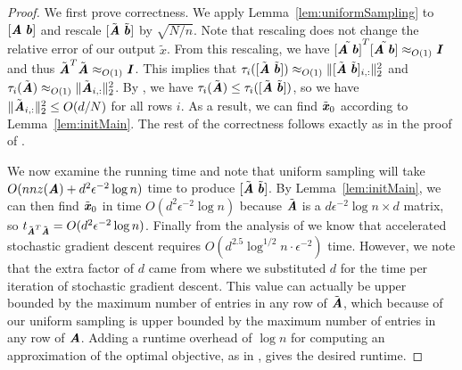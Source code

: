 
\noFastMatrixMult*

\begin{proof}
	We first prove correctness.
	We apply Lemma~\ref{lem:uniformSampling} to $[\AA\;\bb]$ and rescale $[\tilde{\AA}\;\tilde{\bb}]$ by $\sqrt{N/n}$.
	Note that rescaling does not change the relative error of our output $\tilde{x}$.
	From this rescaling, we have $\tilde{[\AA\;\bb]}^T\tilde{[\AA\;\bb]} \approx_{O(1)} \II$ and thus $\tilde{\AA}^T\tilde{\AA} \approx_{O(1)} \II$.
	This implies that $\tau_i([\tilde{\AA}\;\tilde{\bb}]) \approx_{O(1)} \|[\tilde{\AA}\;\tilde{\bb}]_{i,:}\|_2^2$ and $\tau_i(\tilde{\AA}) \approx_{O(1)} \|\tilde{\AA}_{i,:}\|_2^2$.
	By , we have $\tau_i(\tilde{\AA}) \leq \tau_i([\tilde{\AA}\;\tilde{\bb}])$, so we have $\|\tilde{\AA}_{i,:}\|_2^2 \leq O(d/N)$ for all rows $i$.
	As a result, we can find $\tilde{\xx}_0$ according to Lemma~\ref{lem:initMain}.
	The rest of the correctness follows exactly as in the proof of .
	
	We now examine the running time and note that uniform sampling will take $O(nnz(\AA) + d^2\epsilon^{-2}\log{n})$ time to produce $[\tilde{\AA}\;\tilde{\bb}]$.
	By Lemma~\ref{lem:initMain}, we can then find $\tilde{\xx}_0$ in time $O(d^2\epsilon^{-2}\log{n})$ because $\tilde{\AA}$ is a $d\epsilon^{-2}\log{n} \times d$ matrix, so $t_{\tilde{\AA}^T\tilde{\AA}} = O(d^2\epsilon^{-2}\log{n})$.
	Finally from the analysis of  we know that accelerated stochastic gradient descent requires $O(d^{2.5}\log^{1/2}{n}\cdot \epsilon^{-2})$ time.
	However, we note that the extra factor of $d$ came from  where we substituted $d$ for the time per iteration of stochastic gradient descent.
	This value can actually be upper bounded by the maximum number of entries in any row of $\tilde{\AA}$, which because of our uniform sampling is upper bounded by the maximum number of entries in any row of $\AA$.
	Adding a runtime overhead of $\log{n}$ for computing an approximation of the optimal objective, as in , gives the desired runtime.
\end{proof}


